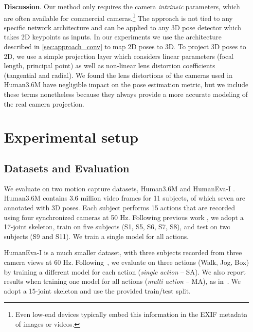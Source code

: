 \documentclass[10pt,twocolumn,letterpaper]{article}
\begin{document}
\noindent\textbf{Discussion}.
Our method only requires the camera \emph{intrinsic} parameters, which are often available for commercial cameras.\footnote{Even low-end devices typically embed this information in the EXIF metadata of images or videos.}
The approach is not tied to any specific network architecture and can be applied to any 3D pose detector which takes 2D keypoints as inputs. 
In our experiments we use the architecture described in \textsection\ref{sec:approach_conv} to map 2D poses to 3D.
To project 3D poses to 2D, we use a simple projection layer which considers linear parameters (focal length, principal point) as well as non-linear lens distortion coefficients (tangential and radial).
We found the lens distortions of the cameras used in Human3.6M have negligible impact on the pose estimation metric, but we include these terms nonetheless because they always provide a more accurate modeling of the real camera projection.

\section{Experimental setup}
\label{sec:setup}

\subsection{Datasets and Evaluation}
We evaluate on two motion capture datasets, Human3.6M \cite{ionescu:human36:2014, ionescu:iccv:2011} and HumanEva-I \cite{sigal:humaneva:2010}.
{Human3.6M} contains 3.6 million video frames for 11 subjects, of which seven are annotated with 3D poses. 
Each subject performs 15 actions that are recorded using four synchronized cameras at 50 Hz. 
Following previous work \cite{pavlakos:coarse:2017, tekin:learning:2017, martinez:simple:2017, sun:compositional:2017, fang:learning:2018, pavlakos:ordinal:2018, yang:3d:2018, luvizon:2d:2018}, we adopt a 17-joint skeleton, train on five subjects (S1, S5, S6, S7, S8), and test on two subjects (S9 and S11).
We train a single model for all actions. 

{HumanEva-I} is a much smaller dataset, with three subjects recorded from three camera views at 60 Hz. 
Following~\cite{martinez:simple:2017, hossain:exploiting:2018}, we evaluate on three actions (Walk, Jog, Box) by training a different model for each action (\emph{single action} -- SA).
We also report results when training one model for all actions (\emph{multi action} -- MA), as in~\cite{pavlakos:coarse:2017, lee:propagating:2018}.
We adopt a 15-joint skeleton and use the provided train/test split.
\end{document}
